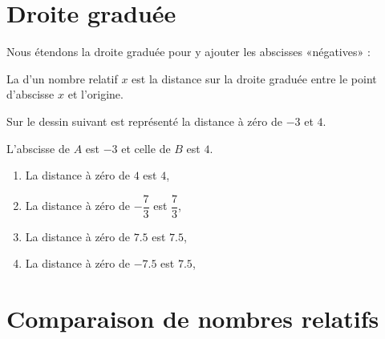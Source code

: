 \section{Droite graduée}



\vspace{3cm}

Nous étendons la droite graduée pour y ajouter les abscisses «négatives» :
\begin{center}
    
\end{center}

\begin{definition}
    La  d'un nombre relatif \( x\) est la distance sur la droite graduée entre le point d'abscisse \( x\) et l'origine.
\end{definition}

\begin{example}
    Sur le dessin suivant est représenté la distance à zéro de \( -3\) et \( 4\).
    \begin{center}
        
    \end{center}
    L'abscisse de \( A\) est \( -3\) et celle de \( B\) est \( 4\).
\end{example}

\begin{example}
    \begin{enumerate}
        \item
            La distance à zéro de \( 4\) est \( 4\),
        \item
            La distance à zéro de \( -\dfrac{ 7 }{ 3 }\) est \( \dfrac{ 7 }{ 3 }\),
        \item
            La distance à zéro de \( 7.5\) est \( 7.5\),
        \item
            La distance à zéro de \( -7.5 \) est \( 7.5\),
    \end{enumerate}
\end{example}

\section{Comparaison de nombres relatifs}

